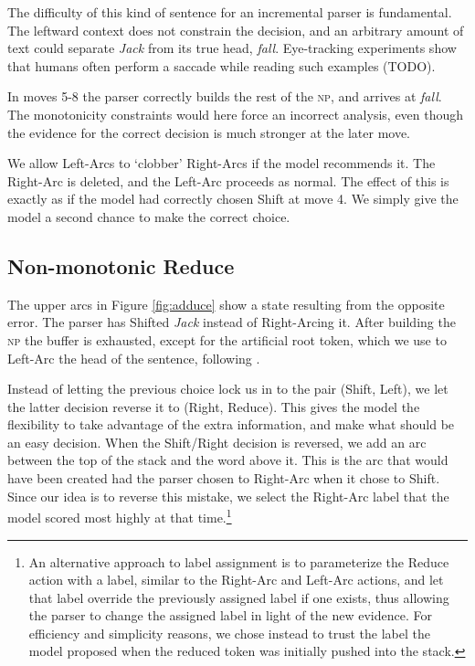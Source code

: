 \documentclass[11pt,letterpaper]{article}
\begin{document}
The difficulty of this kind of sentence for an incremental parser is fundamental.
The leftward context does not constrain the decision, 
and an arbitrary amount of text could separate \emph{Jack} from its true head,
\emph{fall}. Eye-tracking
experiments show that humans often perform a saccade while reading such examples (TODO).

In moves 5-8 the parser correctly builds the rest of the \textsc{np}, and arrives
at \emph{fall}. The monotonicity constraints would here force an incorrect analysis,
even though the evidence for the correct decision is much stronger at the later move.

We allow Left-Arcs to `clobber' Right-Arcs if the model
recommends it. The Right-Arc is deleted, and the Left-Arc proceeds as normal. The
effect of this is exactly as if the model had correctly chosen Shift at
move 4. We simply give the model a second chance to make the correct choice.

\subsection{Non-monotonic Reduce}

The upper arcs in Figure \ref{fig:adduce} show a state resulting from the opposite error.
The parser has Shifted \emph{Jack} instead of Right-Arcing it. After
building the \textsc{np} the buffer is exhausted, except for the artificial root token,
which we use to Left-Arc the head of the sentence, following \citet{nivre:squib}.

Instead of letting the previous choice lock us in to the pair (Shift, Left), we let
the latter decision reverse it to (Right, Reduce). This gives the model the flexibility
to take advantage of the extra information, and make what should be an easy decision.
When the Shift/Right decision is reversed, we add an arc between the top of the stack
and the word above it. This is the arc that would have been created had the parser
chosen to Right-Arc when it chose to Shift. Since our idea is to reverse this mistake,
we select the Right-Arc label that the model scored most highly at that
time.\footnote{An alternative approach to label assignment is to parameterize
the Reduce action with a label, similar to the Right-Arc and Left-Arc actions,
and let that label override the previously assigned label if one exists, thus
allowing the parser to change the assigned label in light of the new evidence. For
efficiency and simplicity reasons, we chose instead to trust the label the model proposed
when the reduced token was initially pushed into the stack.}
\end{document}
